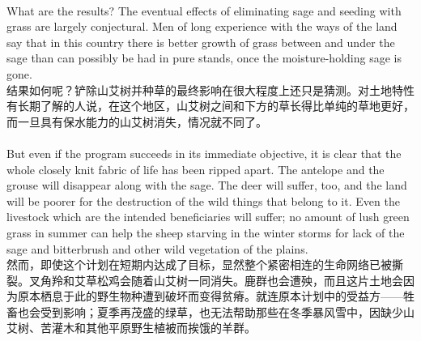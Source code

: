 \documentclass{article}
\begin{document}
\\
What are the results? The eventual effects of eliminating sage and seeding with grass are largely conjectural. Men of long experience with the ways of the land say that in this country there is better growth of grass between and under the sage than can possibly be had in pure stands, once the moisture-holding sage is gone.\\
结果如何呢？铲除山艾树并种草的最终影响在很大程度上还只是猜测。对土地特性有长期了解的人说，在这个地区，山艾树之间和下方的草长得比单纯的草地更好，而一旦具有保水能力的山艾树消失，情况就不同了。 \\

\\
But even if the program succeeds in its immediate objective, it is clear that the whole closely knit fabric of life has been ripped apart. The antelope and the grouse will disappear along with the sage. The deer will suffer, too, and the land will be poorer for the destruction of the wild things that belong to it. Even the livestock which are the intended beneficiaries will suffer; no amount of lush green grass in summer can help the sheep starving in the winter storms for lack of the sage and bitterbrush and other wild vegetation of the plains.\\
然而，即使这个计划在短期内达成了目标，显然整个紧密相连的生命网络已被撕裂。叉角羚和艾草松鸡会随着山艾树一同消失。鹿群也会遭殃，而且这片土地会因为原本栖息于此的野生物种遭到破坏而变得贫瘠。就连原本计划中的受益方——牲畜也会受到影响；夏季再茂盛的绿草，也无法帮助那些在冬季暴风雪中，因缺少山艾树、苦灌木和其他平原野生植被而挨饿的羊群。 \\
\end{document}

